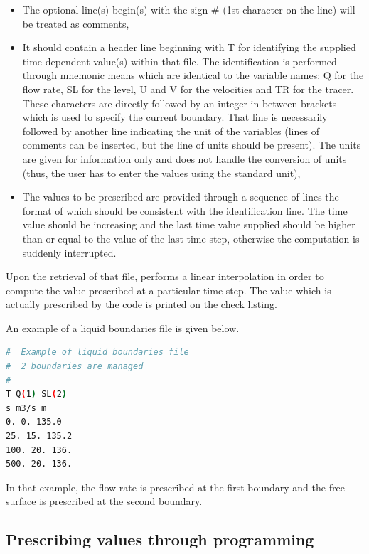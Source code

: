 \begin{itemize}
\item The optional line(s) begin(s) with the sign \# (1st character on the
line) will be treated as comments,

\item It should contain a header line beginning with T for identifying the
supplied time dependent value(s) within that file. The identification is
performed through mnemonic means which are identical to the variable names: Q
for the flow rate, SL for the level, U and V for the velocities and TR for the
tracer. These characters are directly followed by an integer in between
brackets which is used to specify the current boundary. That line is
necessarily followed by another line indicating the unit of the variables
(lines of comments can be inserted, but the line of units should be present).
The units are given for information only and  does not handle the
conversion of units (thus, the user has to enter the values using the standard
unit),

\item The values to be prescribed are provided through a sequence of lines the
format of which should be consistent with the identification line. The time
value should be increasing and the last time value supplied should be higher
than or equal to the value of the last time step, otherwise the computation is
suddenly interrupted.
\end{itemize}

Upon the retrieval of that file,  performs a linear interpolation in
order to compute the value prescribed at a particular time step. The value
which is actually prescribed by the code is printed on the check listing.

An example of a liquid boundaries file is given below.

\begin{lstlisting}[language=bash]
#  Example of liquid boundaries file
#  2 boundaries are managed
#
T Q(1) SL(2)
s m3/s m
0. 0. 135.0
25. 15. 135.2
100. 20. 136.
500. 20. 136.
\end{lstlisting}

In that example, the flow rate is prescribed at the first boundary and the free
surface is prescribed at the second boundary.


\subsection{Prescribing values through programming}

